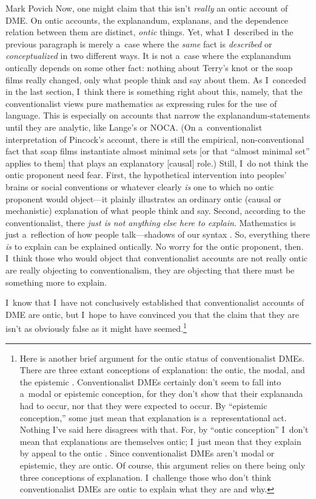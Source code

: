 \begin{artengenv}{Mark Povich}
Now, one might claim that this isn't \textit{really} an ontic account of DME. On ontic accounts, the explanandum, explanans, and the dependence relation between them are distinct, \textit{ontic} things. Yet, what I~described in the previous paragraph is merely a~case where the \textit{same} fact is \textit{described} or \textit{conceptualized} in two different ways. It is not a~case where the explanandum ontically depends on some other fact: nothing about Terry's knot or the soap films really changed, only what people think and say about them. As I~conceded in the last section, I~think there is something right about this, namely, that the conventionalist views pure mathematics as expressing rules for the use of language. This is especially on accounts that narrow the explanandum-statements until they are analytic, like Lange's or NOCA. (On a~conventionalist interpretation of Pincock's account, there is still the empirical, non-conventional fact that soap films instantiate almost minimal sets [or that ``almost minimal set'' applies to them] that plays an explanatory [causal] role.) Still, I~do not think the ontic proponent need fear. First, the hypothetical intervention into peoples' brains or social conventions or whatever clearly \textit{is} one to which no ontic proponent would object---it plainly illustrates an ordinary ontic (causal or mechanistic) explanation of what people think and say. Second, according to the conventionalist, there \textit{just is not anything else here to explain}. Mathematics is just a~reflection of how people talk---shadows of our syntax
\parencite[][]{warren_shadows_2020}. %
 So, everything there \textit{is} to explain can be explained ontically. No worry for the ontic proponent, then. I~think those who would object that conventionalist accounts are not really ontic are really objecting to conventionalism, they are objecting that there must be something more to explain.

I~know that I~have not conclusively established that conventionalist accounts of DME are ontic, but I~hope to have convinced you that the claim that they are isn't as obviously false as it might have seemed.\footnote{Here is another brief argument for the ontic status of conventionalist DMEs. There are three extant conceptions of explanation: the ontic, the modal, and the epistemic
\parencite[][]{salmon_four_1989}. %
 Conventionalist DMEs certainly don't seem to fall into a~modal or epistemic conception, for they don't show that their explananda had to occur, nor that they were expected to occur. By ``epistemic conception,'' some just mean that explanation is a~representational act. Nothing I've said here disagrees with that. For, by ``ontic conception'' I~don't mean that explanations are themselves ontic; I~just mean that they explain by appeal to the ontic 
\parencite[see][]{kaiser_ontic_2014}. %
 Since conventionalist DMEs aren't modal or epistemic, they are ontic. Of course, this argument relies on there being only three conceptions of explanation. I~challenge those who don't think conventionalist DMEs are ontic to explain what they are and why.}


\end{artengenv}
